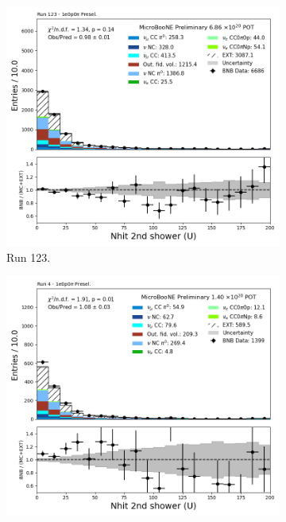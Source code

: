 \begin{figure}[H]
    \centering
    \begin{subfigure}[t]{0.32\linewidth}
        \includegraphics[width=\linewidth]{technote/Appendix_Preselection/Figures/1e0p0pi/Run123/secondshower_U_nhit_Run123_1e0p0pi_Presel.png}
        \caption{Run 123.}
    \end{subfigure}%
    \hspace{0.2cm}%
    \begin{subfigure}[t]{0.32\linewidth}
        \includegraphics[width=\linewidth]{technote/Appendix_Preselection/Figures/1e0p0pi/Run4b/secondshower_U_nhit_Run4b_1e0p0pi_Presel.png}

\end{subfigure}
\end{figure}

